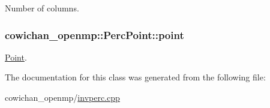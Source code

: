 Number of columns. \hypertarget{classcowichan__openmp_1_1_perc_point_a6dc78f386f5b285da81fae978af9107}{
\subsubsection[{point}]{ {\bf cowichan\_\-openmp::PercPoint::point}}}
\label{classcowichan__openmp_1_1_perc_point_a6dc78f386f5b285da81fae978af9107}


\hyperlink{class_point}{Point}. 

The documentation for this class was generated from the following file:\begin{CompactItemize}
\item 
cowichan\_\-openmp/\hyperlink{cowichan__openmp_2invperc_8cpp}{invperc.cpp}\end{CompactItemize}
